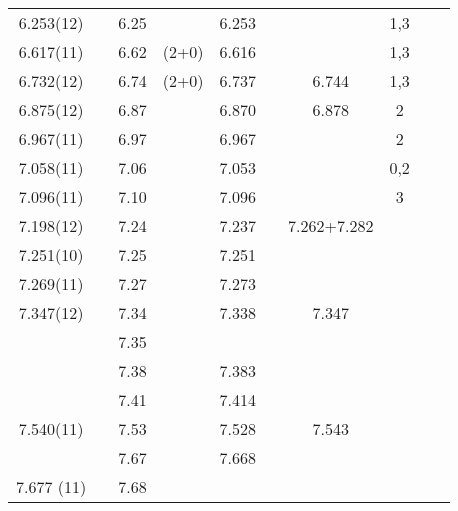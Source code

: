 \begin{landscape}
\begin{center}
\begin{longtable}{cc cc cc cc cc}
6.253(12)       &              & 6.25     &         & 6.253      &                &       & 1,3      &          &      \\
6.617(11)       &              & 6.62     & (2+0)   & 6.616      &                &       & 1,3      &          &      \\
6.732(12)       &              & 6.74     & (2+0)   & 6.737      &                & 6.744 & 1,3      &          &      \\
6.875(12)       &              & 6.87     &         & 6.870      &                & 6.878 & 2        &          &      \\
6.967(11)       &              & 6.97     &         & 6.967      &                &       & 2        &          &      \\
7.058(11)       &              & 7.06     &         & 7.053      &                &       & 0,2      &          &      \\
7.096(11)       &              & 7.10     &         & 7.096      &                &       & 3        &          &      \\
7.198(12)       &              & 7.24     &         & 7.237      &                & 7.262+7.282 &    &          &      \\
7.251(10)       &              & 7.25     &         & 7.251      &                &       &          &          &      \\
7.269(11)       &              & 7.27     &         & 7.273      &                &       &          &          &      \\
7.347(12)       &              & 7.34     &         & 7.338      &                & 7.347 &          &          &      \\
                &              & 7.35     &         &            &                &       &          &          &      \\
                &              & 7.38     &         & 7.383      &                &       &          &          &      \\
                &              & 7.41     &         & 7.414      &                &       &          &          &      \\
7.540(11)       &              & 7.53     &         & 7.528      &                & 7.543 &          &          &      \\
                &              & 7.67     &         & 7.668      &                &       &          &          &      \\
7.677 (11)      &              & 7.68     &         &            &                &       &          &          &      \\

\end{longtable}
\end{center}
\end{landscape}
